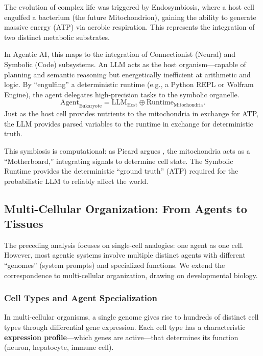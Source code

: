 The evolution of complex life was triggered by Endosymbiosis, where a host cell engulfed a bacterium (the future
Mitochondrion), gaining the ability to generate massive energy (ATP) via aerobic respiration. This represents the
integration of two distinct metabolic substrates.

In Agentic AI, this maps to the integration of Connectionist (Neural) and Symbolic (Code) subsystems. An LLM acts
as the host organism---capable of planning and semantic reasoning but energetically inefficient at arithmetic and
logic. By ``engulfing'' a deterministic runtime (e.g., a Python REPL or Wolfram Engine), the agent delegates
high-precision tasks to the symbolic organelle.
\begin{equation}
\mathrm{Agent}_{\text{Eukaryote}} = \mathrm{LLM}_{\text{Host}} \oplus \mathrm{Runtime}_{\text{Mitochondria}}.
\label{eq:endosymbiosis}
\end{equation}
Just as the host cell provides nutrients to the mitochondria in exchange for ATP, the LLM provides parsed
variables to the runtime in exchange for deterministic truth.

This symbiosis is computational: as Picard argues \cite{picard2022mips}, the mitochondria acts as a ``Motherboard,''
integrating signals to determine cell state. The Symbolic Runtime provides the deterministic ``ground truth'' (ATP)
required for the probabilistic LLM to reliably affect the world.

\subsection{Multi-Cellular Organization: From Agents to Tissues}\label{sec:multi-cellular}

The preceding analysis focuses on single-cell analogies: one agent as one cell. However, most agentic systems
involve multiple distinct agents with different ``genomes'' (system prompts) and specialized functions. We extend
the correspondence to multi-cellular organization, drawing on developmental biology.

\subsubsection{Cell Types and Agent Specialization}

In multi-cellular organisms, a single genome gives rise to hundreds of distinct cell types through differential
gene expression. Each cell type has a characteristic \textbf{expression profile}---which genes are active---that
determines its function (neuron, hepatocyte, immune cell).

